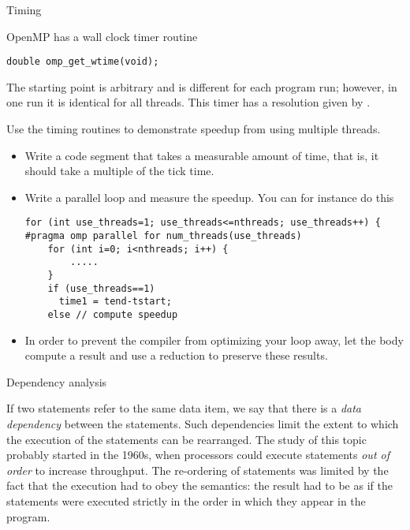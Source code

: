  {Timing}
\label{sec:omp-timing}

OpenMP has a wall clock timer routine 
\begin{verbatim}
double omp_get_wtime(void);
\end{verbatim}
The starting point is arbitrary and is different for each program run;
however, in one run it is identical for all threads.
This timer has a resolution given by .

\begin{exercise}
  Use the timing routines to demonstrate speedup from using
  multiple threads.
  \begin{itemize}
  \item Write a code segment that takes a measurable amount of time, that is,
    it should take a multiple of the tick time.
  \item Write a parallel loop and measure the speedup. You can for instance do this
\begin{verbatim}
for (int use_threads=1; use_threads<=nthreads; use_threads++) {
#pragma omp parallel for num_threads(use_threads)
    for (int i=0; i<nthreads; i++) {
        .....
    }
    if (use_threads==1)
      time1 = tend-tstart;
    else // compute speedup
\end{verbatim}
\item In order to prevent the compiler from optimizing your loop away, let
  the body compute a result and use a reduction to preserve these results.
  \end{itemize}
\end{exercise}

 {Dependency analysis}

If two statements refer to the same data item,
we say that there is a \emph{data dependency} between
the statements. Such dependencies limit the extent to which
the execution of the statements can be  rearranged.
The study of this topic probably started in the 1960s,
when processors could execute statements \emph{out of order}
to increase throughput. The re-ordering of statements
was limited by the fact that the execution
had to obey the  semantics:
the result had to be as if the statements were executed
strictly in the order in which they appear in the program.

